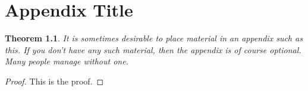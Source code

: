 \renewcommand{\baselinestretch}{1.5}
\chapter{Appendix Title}
\label{App:Poly}

\newtheorem{Theorem}{Theorem}

\begin{Theorem}
It is sometimes desirable to place material in an appendix such as this. If you don't have any such material, then the appendix is of course optional. Many people manage without one.
\end{Theorem}
\begin{proof}
This is the proof.
\end{proof}